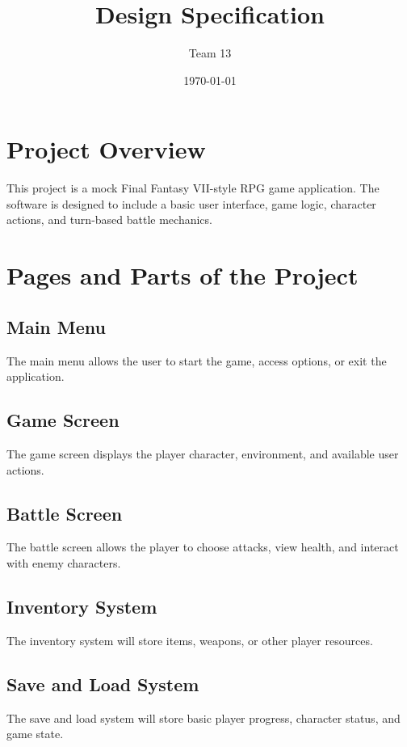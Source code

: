 \documentclass{article}
\begin{document}
\title{Design Specification}
\author{Team 13}
\date{\today}
\maketitle

\newpage
\tableofcontents
\newpage

\section{Project Overview}
This project is a mock Final Fantasy VII-style RPG game application. The software is designed to include a basic user interface, game logic, character actions, and turn-based battle mechanics.

\section{Pages and Parts of the Project}

\subsection{Main Menu}
The main menu allows the user to start the game, access options, or exit the application.

\subsection{Game Screen}
The game screen displays the player character, environment, and available user actions.

\subsection{Battle Screen}
The battle screen allows the player to choose attacks, view health, and interact with enemy characters.

\subsection{Inventory System}
The inventory system will store items, weapons, or other player resources.

\subsection{Save and Load System}
The save and load system will store basic player progress, character status, and game state.
\end{document}
